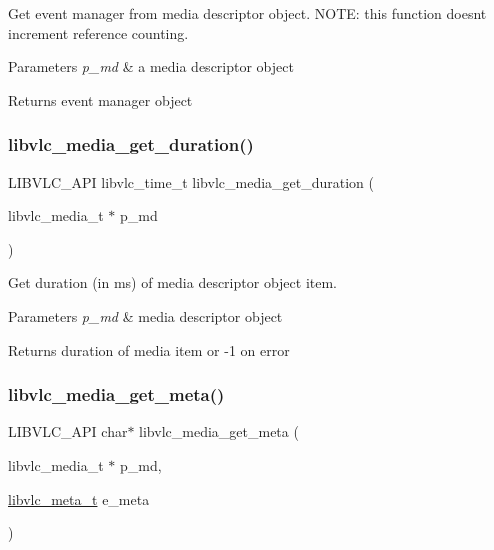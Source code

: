 Get event manager from media descriptor object. N\+O\+TE\+: this function doesn\textquotesingle{}t increment reference counting.


\begin{DoxyParams}{Parameters}
{\em p\+\_\+md} & a media descriptor object \\
\hline
\end{DoxyParams}
\begin{DoxyReturn}{Returns}
event manager object 
\end{DoxyReturn}
\mbox{\label{group__libvlc__media_gadd2c47a0112a31e200a0145d0504873b}} 
\subsubsection{\texorpdfstring{libvlc\+\_\+media\+\_\+get\+\_\+duration()}{libvlc\_media\_get\_duration()}}
{\footnotesize\ttfamily L\+I\+B\+V\+L\+C\+\_\+\+A\+PI libvlc\+\_\+time\+\_\+t libvlc\+\_\+media\+\_\+get\+\_\+duration (\begin{DoxyParamCaption}\item[{libvlc\+\_\+media\+\_\+t $\ast$}]{p\+\_\+md }\end{DoxyParamCaption})}

Get duration (in ms) of media descriptor object item.


\begin{DoxyParams}{Parameters}
{\em p\+\_\+md} & media descriptor object \\
\hline
\end{DoxyParams}
\begin{DoxyReturn}{Returns}
duration of media item or -\/1 on error 
\end{DoxyReturn}
\mbox{\label{group__libvlc__media_ga47684ea1970f0c5cddb96a717a75ed6f}} 
\subsubsection{\texorpdfstring{libvlc\+\_\+media\+\_\+get\+\_\+meta()}{libvlc\_media\_get\_meta()}}
{\footnotesize\ttfamily L\+I\+B\+V\+L\+C\+\_\+\+A\+PI char$\ast$ libvlc\+\_\+media\+\_\+get\+\_\+meta (\begin{DoxyParamCaption}\item[{libvlc\+\_\+media\+\_\+t $\ast$}]{p\+\_\+md,  }\item[{\hyperlink{group__libvlc__media_ga90e7814a020f87d4c443d8d09b6dd4a0}{libvlc\+\_\+meta\+\_\+t}}]{e\+\_\+meta }\end{DoxyParamCaption})}

